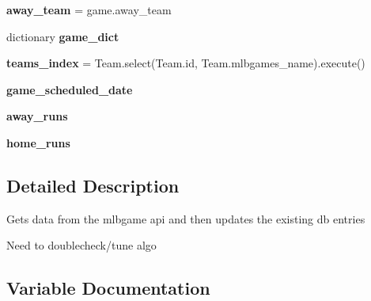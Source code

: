 \begin{DoxyCompactItemize}
\item 
{\bfseries away\+\_\+team} = game.\+away\+\_\+team\hypertarget{namespaceglobal__update_a8fa294169b3a728c148723e727772df5}{}\label{namespaceglobal__update_a8fa294169b3a728c148723e727772df5}

\item 
dictionary {\bfseries game\+\_\+dict}
\item 
{\bfseries teams\+\_\+index} = Team.\+select(Team.\+id, Team.\+mlbgames\+\_\+name).execute()\hypertarget{namespaceglobal__update_a0fd1e3180de74052ac30d2e658cd9cc6}{}\label{namespaceglobal__update_a0fd1e3180de74052ac30d2e658cd9cc6}

\item 
{\bfseries game\+\_\+scheduled\+\_\+date}
\item 
{\bfseries away\+\_\+runs}\hypertarget{namespaceglobal__update_ae2a6b01480c3a99b27c63a527f0a8d3e}{}\label{namespaceglobal__update_ae2a6b01480c3a99b27c63a527f0a8d3e}

\item 
{\bfseries home\+\_\+runs}\hypertarget{namespaceglobal__update_a9a18817cfde4467ab9d0a7f97bb78bd2}{}\label{namespaceglobal__update_a9a18817cfde4467ab9d0a7f97bb78bd2}

\end{DoxyCompactItemize}


\subsection{Detailed Description}
\begin{DoxyVerb}Gets data from the mlbgame api
and then updates the existing db entries

Need to doublecheck/tune algo
\end{DoxyVerb}
 

\subsection{Variable Documentation}

